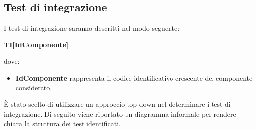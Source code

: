 \documentclass[../PianoDiQualifica_v3.0.0.tex]{subfiles}
\begin{document}
	\subsection{Test di integrazione}
	I test di integrazione saranno descritti nel modo seguente:
	\begin{center}
		\textbf{TI[IdComponente]}
	\end{center}
	dove:
	\begin{itemize}
		\item \textbf{IdComponente} rappresenta il codice identificativo crescente del componente considerato.
	\end{itemize}
	È stato scelto di utilizzare un approccio top-down nel determinare i test di integrazione. Di seguito viene riportato un diagramma informale per rendere chiara la struttura dei test identificati.
	\\
\end{document}
